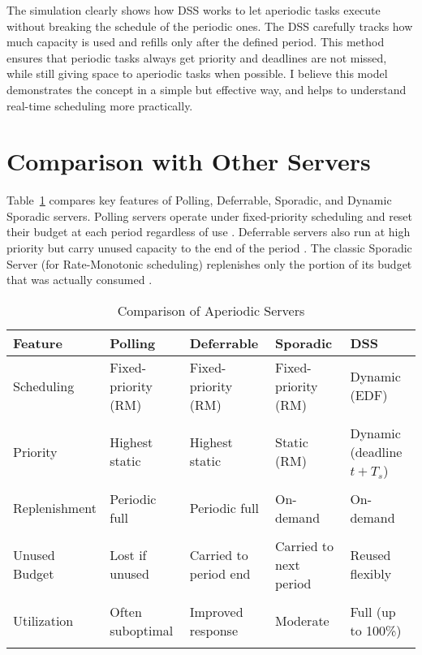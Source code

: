 \documentclass[conference]{IEEEtran}
\begin{document}
The simulation clearly shows how DSS works to let aperiodic tasks execute without breaking the schedule of the periodic ones. The DSS carefully tracks how much capacity is used and refills only after the defined period. This method ensures that periodic tasks always get priority and deadlines are not missed, while still giving space to aperiodic tasks when possible. I believe this model demonstrates the concept in a simple but effective way, and helps to understand real-time scheduling more practically.

\section{Comparison with Other Servers}
Table~\ref{tab:servers} compares key features of Polling, Deferrable, Sporadic, and Dynamic Sporadic servers.  Polling servers operate under fixed-priority scheduling and reset their budget at each period regardless of use \cite{sprunt1989aperiodic}.  Deferrable servers also run at high priority but carry unused capacity to the end of the period \cite{buttazzo2011hard}.  The classic Sporadic Server (for Rate-Monotonic scheduling) replenishes only the portion of its budget that was actually consumed \cite{sprunt1989aperiodic}.  


\begin{table}[ht]
\centering
\renewcommand{\arraystretch}{1.1} %
\begin{tabularx}{\columnwidth}{l|X|X|X|X}
\textbf{Feature} & \textbf{Polling} & \textbf{Deferrable} & \textbf{Sporadic} & \textbf{DSS} \\
\hline
Scheduling & Fixed-priority (RM) & Fixed-priority (RM) & Fixed-priority (RM) & Dynamic (EDF) \\\\
Priority & Highest static & Highest static & Static (RM) & Dynamic (deadline $t+T_s$) \\\\
Replenishment & Periodic full & Periodic full & On-demand & On-demand \\\\
Unused Budget & Lost if unused & Carried to period end & Carried to next period & Reused flexibly \\\\
Utilization & Often suboptimal & Improved response & Moderate & Full (up to 100\%) \\\\
\end{tabularx}
\caption{Comparison of Aperiodic Servers}
\label{tab:servers}
\end{table}
\end{document}
